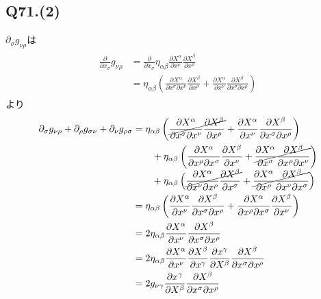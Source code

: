 \documentclass[uplatex,a4j,11pt,dvipdfmx]{jsarticle}
\begin{document}
\subsection*{Q71.(2)}
$\partial_\sigma g_{\nu\rho}$は
\begin{align}
  \begin{split}
    \frac{\partial}{\partial x_\sigma}g_{\nu\rho}&=\frac{\partial}{\partial x_\sigma}\eta_{\alpha\beta}\frac{\partial X^{\alpha}}{\partial x^\nu}\frac{\partial X^{\beta}}{\partial x^\rho}\\
    &=\eta_{\alpha\beta}\left(\frac{\partial X^\alpha}{\partial x^\sigma\partial x^\nu}\frac{\partial X^\beta}{\partial x^\rho}+\frac{\partial X^\alpha}{\partial x^\nu}\frac{\partial X^\beta}{\partial x^\sigma\partial x^\rho}\right)
  \end{split}
\end{align}
より
\begin{align}
  \begin{split}
    \partial_\sigma g_{\nu\rho}+\partial_\rho g_{\sigma\nu}+\partial_\nu g_{\rho\sigma}
    &=\eta_{\alpha\beta}\left(\cancel{\frac{\partial X^\alpha}{\partial x^\sigma\partial x^\nu}\frac{\partial X^\beta}{\partial x^\rho}} + \frac{\partial X^\alpha}{\partial x^\nu}\frac{\partial X^\beta}{\partial x^\sigma\partial x^\rho}\right)\\
    &\qquad+\eta_{\alpha\beta}\left(\frac{\partial X^\alpha}{\partial x^\rho\partial x^\sigma}\frac{\partial X^\beta}{\partial x^\nu} + \cancel{\frac{\partial X^\alpha}{\partial x^\sigma}\frac{\partial X^\beta}{\partial x^\rho\partial x^\nu}}\right)\\
    &\qquad+\eta_{\alpha\beta}\left(\cancel{\frac{\partial X^\alpha}{\partial x^\nu\partial x^\rho}\frac{\partial X^\beta}{\partial x^\sigma}} + \cancel{\frac{\partial X^\alpha}{\partial x^\rho}\frac{\partial X^\beta}{\partial x^\nu\partial x^\sigma}}\right)\\
    &=\eta_{\alpha\beta}\left(\frac{\partial X^\alpha}{\partial x^\nu}\frac{\partial X^\beta}{\partial x^\sigma\partial x^\rho} + \frac{\partial X^\alpha}{\partial x^\rho\partial x^\sigma}\frac{\partial X^\beta}{\partial x^\nu}\right)\\
    &=2\eta_{\alpha\beta}\frac{\partial X^\alpha}{\partial x^\nu}\frac{\partial X^\beta}{\partial x^\sigma\partial x^\rho}\\
    &=2\eta_{\alpha\beta}\frac{\partial X^\alpha}{\partial x^\nu}\frac{\partial X^\beta}{\partial x^\gamma}\frac{\partial x^\gamma}{\partial X^\beta}\frac{\partial X^\beta}{\partial x^\sigma\partial x^\rho}\\
    &=2g_{\nu\gamma}\frac{\partial x^\gamma}{\partial X^\beta}\frac{\partial X^\beta}{\partial x^\sigma\partial x^\rho}
  \end{split}
\end{align}
\end{document}
